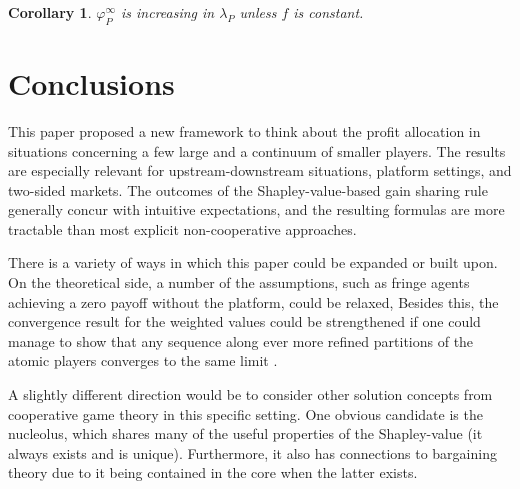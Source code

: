 \documentclass[a4paper]{article}
\newtheorem{corollary}{Corollary}
\begin{document}
\begin{corollary}
    \label{cor:platform_value_multiple_sides_weighted}
    $\varphi_P^\infty$ is increasing in $\lambda_P$ unless $f$ is constant.
\end{corollary}


\section{Conclusions}

This paper proposed a new framework to think about the profit allocation in situations concerning a few large and a continuum of smaller players.
The results are especially relevant for upstream-downstream situations, platform settings, and two-sided markets.
The outcomes of the Shapley-value-based gain sharing rule generally concur with intuitive expectations, and the resulting formulas are more tractable than most explicit non-cooperative approaches.


There is a variety of ways in which this paper could be expanded or built upon.
On the theoretical side, a number of the assumptions, such as fringe agents achieving a zero payoff without the platform, could be relaxed,
Besides this, the convergence result for the weighted values could be strengthened if one could manage to show that any sequence along ever more refined partitions of the atomic players converges to the same limit \parencite[à la][]{fogelman1980asymptotic}.

A slightly different direction would be to consider other solution concepts from cooperative game theory in this specific setting.
One obvious candidate is the nucleolus, which shares many of the useful properties of the Shapley-value (it always exists and is unique).
Furthermore, it also has connections to bargaining theory due to it being contained in the core when the latter exists.
\end{document}
